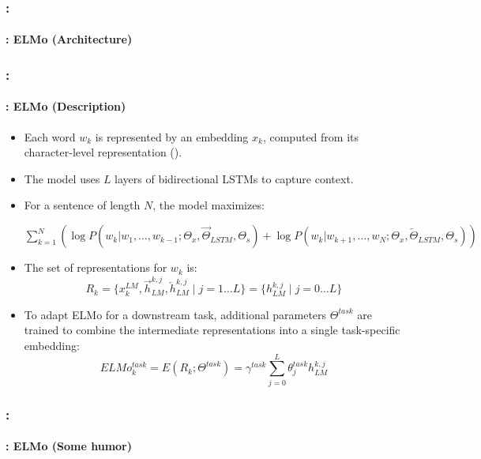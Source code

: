\documentclass[xcolor=table]{beamer}
\begin{document}
\begin{frame}
	\frametitle{\insertshortsubtitle: \insertsection}
	\framesubtitle{\insertsubsection: ELMo (Architecture)}
	\vspace{-4pt}
	
\end{frame}

\begin{frame}
	\frametitle{\insertshortsubtitle: \insertsection}
	\framesubtitle{\insertsubsection: ELMo (Description)}
	\begin{itemize}
		\item Each word $w_k$ is represented by an embedding $x_k$, computed from its character-level representation (\cite{2015-kim-al}).
		\item The model uses $L$ layers of bidirectional LSTMs to capture context.
		\item For a sentence of length $N$, the model maximizes:
		\begin{center}
			$\sum_{k=1}^{N} (
			\log P(w_k | w_1,\ldots,w_{k-1}; \Theta_x, \overrightarrow{\Theta}_{LSTM}, \Theta_s)
			+
			\log P(w_k | w_{k+1},\ldots,w_{N}; \Theta_x, \overleftarrow{\Theta}_{LSTM}, \Theta_s)
			)
			$
		\end{center}
		
		\item The set of representations for $w_k$ is:
		\[
		R_k = \{x_k^{LM}, \overrightarrow{h}_{LM}^{k, j}, \overleftarrow{h}_{LM}^{k, j} \mid j= 1 \ldots L \} 
		= \{ h_{LM}^{k, j} \mid j=0 \ldots L \}
		\]
		
		\item To adapt ELMo for a downstream task, additional parameters $\Theta^{task}$ are trained to combine the intermediate representations into a single task-specific embedding:
		\vspace{-8pt}
		\[
		ELMo_k^{task} = E(R_k; \Theta^{task}) = \gamma^{task} \sum_{j=0}^{L} \theta_j^{task} h_{LM}^{k, j}
		\]
	\end{itemize}
	
\end{frame}


\begin{frame}
	\frametitle{\insertshortsubtitle: \insertsection}
	\framesubtitle{\insertsubsection: ELMo (Some humor)}

	\begin{center}
	\end{center}
	
\end{frame}
\end{document}
